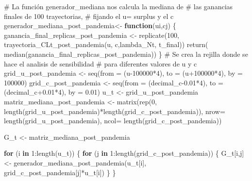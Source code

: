 \documentclass[
  us-letterpaper,
]{scrreprt}
\newenvironment{Shaded}{\begin{snugshade}}{\end{snugshade}}
\newcommand{\AttributeTok}[1]{\textcolor[rgb]{0.40,0.45,0.13}{#1}}
\newcommand{\CommentTok}[1]{\textcolor[rgb]{0.37,0.37,0.37}{#1}}
\newcommand{\ControlFlowTok}[1]{\textcolor[rgb]{0.00,0.23,0.31}{\textbf{#1}}}
\newcommand{\DecValTok}[1]{\textcolor[rgb]{0.68,0.00,0.00}{#1}}
\newcommand{\FloatTok}[1]{\textcolor[rgb]{0.68,0.00,0.00}{#1}}
\newcommand{\FunctionTok}[1]{\textcolor[rgb]{0.28,0.35,0.67}{#1}}
\newcommand{\NormalTok}[1]{\textcolor[rgb]{0.00,0.23,0.31}{#1}}
\newcommand{\OtherTok}[1]{\textcolor[rgb]{0.00,0.23,0.31}{#1}}
\newcommand{\SpecialCharTok}[1]{\textcolor[rgb]{0.37,0.37,0.37}{#1}}
\theoremstyle{plain}
\theoremstyle{plain}
\theoremstyle{definition}
\theoremstyle{remark}
\begin{document}
\begin{Shaded}
\begin{Highlighting}[]
\CommentTok{\# La función generador\_mediana nos calcula la mediana de }
\CommentTok{\# las ganancias finales de 100 trayectorias, }
\CommentTok{\# fijando el u= surplus y el c}
\NormalTok{generador\_mediana\_post\_pandemia}\OtherTok{\textless{}{-}} \ControlFlowTok{function}\NormalTok{(ui,cj)}
\NormalTok{  \{}
\NormalTok{  ganancia\_final\_replicas\_post\_pandemia }\OtherTok{\textless{}{-}} \FunctionTok{replicate}\NormalTok{(}\DecValTok{100}\NormalTok{,}
           \FunctionTok{trayectoria\_CLt\_post\_pandemia}\NormalTok{(u, c,lambda\_Nt, t\_final))}
    \FunctionTok{return}\NormalTok{( }\FunctionTok{median}\NormalTok{(ganancia\_final\_replicas\_post\_pandemia))}
\NormalTok{  \}}
\CommentTok{\# Se crea la rejilla donde se hace el analisis de sensibilidad}
\CommentTok{\# para diferentes valores de u y c}
\NormalTok{grid\_u\_post\_pandemia }\OtherTok{\textless{}{-}} \FunctionTok{seq}\NormalTok{(}\AttributeTok{from =}\NormalTok{ (u}\DecValTok{{-}100000}\SpecialCharTok{*}\DecValTok{4}\NormalTok{), }
                            \AttributeTok{to =}\NormalTok{ (u}\SpecialCharTok{+}\DecValTok{100000}\SpecialCharTok{*}\DecValTok{4}\NormalTok{), }
                            \AttributeTok{by =} \DecValTok{100000}\NormalTok{)}
\NormalTok{grid\_c\_post\_pandemia }\OtherTok{\textless{}{-}} \FunctionTok{seq}\NormalTok{(}\AttributeTok{from =}\NormalTok{ (decimal\_c}\FloatTok{{-}0.01}\SpecialCharTok{*}\DecValTok{4}\NormalTok{), }
                            \AttributeTok{to =}\NormalTok{ (decimal\_c}\FloatTok{+0.01}\SpecialCharTok{*}\DecValTok{4}\NormalTok{), }
                            \AttributeTok{by =} \FloatTok{0.01}\NormalTok{)}
\NormalTok{u\_t }\OtherTok{\textless{}{-}}\NormalTok{ grid\_u\_post\_pandemia}
\NormalTok{matriz\_mediana\_post\_pandemia }\OtherTok{\textless{}{-}} \FunctionTok{matrix}\NormalTok{(}\FunctionTok{rep}\NormalTok{(}\DecValTok{0}\NormalTok{, }
      \FunctionTok{length}\NormalTok{(grid\_u\_post\_pandemia)}\SpecialCharTok{*}\FunctionTok{length}\NormalTok{(grid\_c\_post\_pandemia)),}
      \AttributeTok{nrow=} \FunctionTok{length}\NormalTok{(grid\_u\_post\_pandemia), }
      \AttributeTok{ncol=} \FunctionTok{length}\NormalTok{(grid\_c\_post\_pandemia))}

\NormalTok{G\_t }\OtherTok{\textless{}{-}}\NormalTok{ matriz\_mediana\_post\_pandemia}

\ControlFlowTok{for}\NormalTok{ (i }\ControlFlowTok{in} \DecValTok{1}\SpecialCharTok{:}\FunctionTok{length}\NormalTok{(u\_t)) }
\NormalTok{\{}
  \ControlFlowTok{for}\NormalTok{ (j }\ControlFlowTok{in} \DecValTok{1}\SpecialCharTok{:}\FunctionTok{length}\NormalTok{(grid\_c\_post\_pandemia)) }
\NormalTok{  \{}
\NormalTok{    G\_t[i,j] }\OtherTok{\textless{}{-}} \FunctionTok{generador\_mediana\_post\_pandemia}\NormalTok{(u\_t[i], }
\NormalTok{                                  grid\_c\_post\_pandemia[j]}\SpecialCharTok{*}\NormalTok{u\_t[i])}
\NormalTok{  \}}
\NormalTok{\} }


\end{Highlighting}
\end{Shaded}
\end{document}
